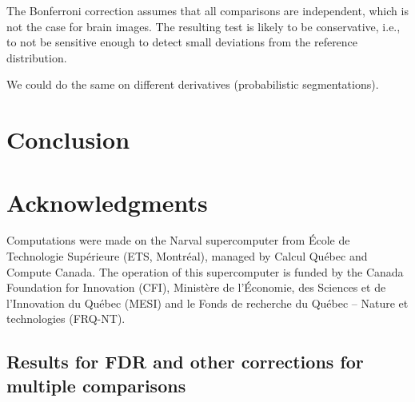 \documentclass{article}
\begin{document}
The Bonferroni correction assumes that all comparisons are independent, which is not the case for brain images. The resulting test is likely to be conservative, i.e., to not be sensitive enough to detect small deviations from the reference distribution. 

We could do the same on different derivatives (probabilistic segmentations).

\section{Conclusion}
\section{Acknowledgments}

 Computations were made on the Narval supercomputer from \'Ecole de Technologie Sup\'erieure (ETS, Montr\'eal), managed by Calcul Québec and Compute Canada. The operation of this supercomputer is funded by the Canada Foundation for Innovation (CFI), Ministère de l’Économie, des Sciences et de l’Innovation du Québec (MESI) and le Fonds de recherche du Québec – Nature et technologies (FRQ-NT).


\begin{appendices}
\section{Results for FDR and other corrections for multiple comparisons}
\label{appendix:multiple-comparison-tests}
\end{appendices}




\end{document}
